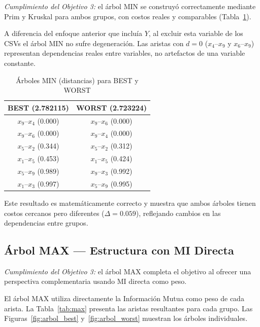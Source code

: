 \documentclass[12pt, a4paper]{article}
\begin{document}
\textit{Cumplimiento del Objetivo 3:} el árbol MIN se construyó
correctamente mediante Prim y Kruskal para ambos grupos, con costos
reales y comparables (Tabla~\ref{tab:min}).

A diferencia del enfoque anterior que incluía $Y$, al excluir esta variable
de los CSVs el árbol MIN no sufre degeneración. Las aristas con $d=0$
($x_4$--$x_9$ y $x_6$--$x_9$) representan dependencias reales entre
variables, no artefactos de una variable constante.

\begin{table}[H]
    \centering
    \caption{Árboles MIN (distancias) para BEST y WORST}
    \label{tab:min}
    \small
    \begin{tabular}{c@{\qquad}c}
    \toprule
    \textbf{BEST (2.782115)} & \textbf{WORST (2.723224)} \\
    \midrule
    $x_9$--$x_4$ (0.000) & $x_9$--$x_6$ (0.000) \\
    $x_9$--$x_6$ (0.000) & $x_9$--$x_4$ (0.000) \\
    $x_5$--$x_2$ (0.344) & $x_5$--$x_2$ (0.312) \\
    $x_1$--$x_5$ (0.453) & $x_1$--$x_5$ (0.424) \\
    $x_5$--$x_9$ (0.989) & $x_9$--$x_3$ (0.992) \\
    $x_1$--$x_3$ (0.997) & $x_5$--$x_9$ (0.995) \\
    \bottomrule
    \end{tabular}
\end{table}

Este resultado es matemáticamente correcto y muestra que ambos árboles
tienen costos cercanos pero diferentes ($\Delta = 0.059$), reflejando
cambios en las dependencias entre grupos.

\subsection{Árbol MAX --- Estructura con MI Directa}

\textit{Cumplimiento del Objetivo 3:} el árbol MAX completa el objetivo
al ofrecer una perspectiva complementaria usando MI directa como peso.

El árbol MAX utiliza directamente la Información Mutua como peso de cada
arista. La Tabla~\ref{tab:max} presenta
las aristas resultantes para cada grupo. Las Figuras~\ref{fig:arbol_best}
y~\ref{fig:arbol_worst} muestran los árboles individuales.
\end{document}
